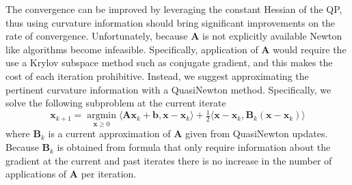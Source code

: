 \documentclass{article}
\newcommand{\x}{\mathbf{x}}
\renewcommand{\b}{\mathbf{b}}
\newcommand{\A}{\mathbf{A}}
\renewcommand{\H}{\mathbf{H}}
\newcommand{\B}{\mathbf{B}}
\newcommand{\prox}{\operatorname{prox}}
\newcommand{\argmin}{\operatorname{argmin}}
\begin{document}
The convergence can be improved by leveraging the constant Hessian of the QP, thus using curvature information should bring significant improvements on the rate of convergence. Unfortunately, because $\A$ is not explicitly available Newton like algorithms become infeasible. Specifically, application of $\A$ would require the use a Krylov subspace method such as conjugate gradient, and this makes the cost of each iteration prohibitive. Instead, we suggest approximating the pertinent curvature information with a QuasiNewton method. Specifically, we solve the following  subproblem at the current iterate 
\begin{equation} \label{eq:qn-quadMod}
    \x_{k+1} = \underset{\x \geq 0}{\argmin} \langle \A \x_k + \b, \x-\x_k \rangle + \tfrac{1}{2}\langle \x-\x_k , \B_k(\x-\x_k )\rangle %
\end{equation}
where $\B_k$ is a current approximation of $\A$ given from QuasiNewton updates. Because $\B_k$ is obtained from formula that only require information about the gradient at the current and past iterates there is no increase in the number of applications of $\A$ per iteration.%
\end{document}
